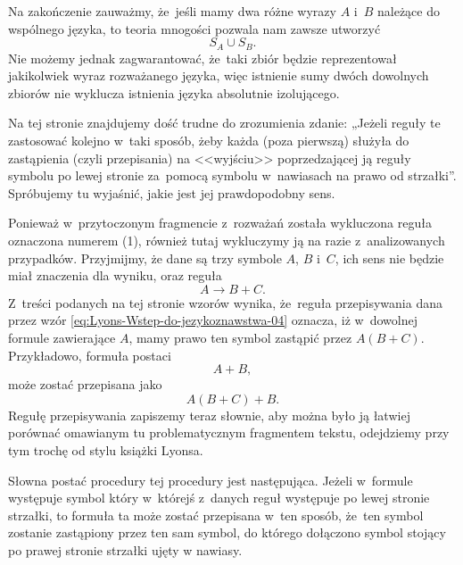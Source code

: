 \documentclass[a4paper,11pt]{article}
\begin{document}
Na zakończenie zauważmy, że~jeśli mamy dwa różne wyrazy $A$ i~$B$ należące
do wspólnego języka, to teoria mnogości pozwala nam zawsze utworzyć
\begin{equation}
  \label{eq:Lyons-Wstep-do-jezykoznawstwa-03}
  S_{ A } \cup S_{ B }.
\end{equation}
Nie możemy jednak zagwarantować, że~taki zbiór będzie reprezentował
jakikolwiek wyraz rozważanego języka, więc istnienie sumy dwóch dowolnych
zbiorów nie wyklucza istnienia języka absolutnie izolującego.

\vspace{\spaceFour}





 Na tej stronie znajdujemy dość trudne do zrozumienia
zdanie: „Jeżeli reguły te zastosować kolejno w~taki sposób, żeby każda (poza
pierwszą) służyła do zastąpienia (czyli przepisania) na <<wyjściu>>
poprzedzającej ją reguły symbolu po lewej stronie za~pomocą symbolu
w~nawiasach na prawo od strzałki”. Spróbujemy tu wyjaśnić, jakie jest jej
prawdopodobny sens.

Ponieważ w~przytoczonym fragmencie z~rozważań została wykluczona reguła
oznaczona numerem (1), również tutaj wykluczymy ją na razie z~analizowanych
przypadków. Przyjmijmy, że dane są trzy symbole $A$, $B$ i~$C$, ich sens nie
będzie miał znaczenia dla wyniku, oraz reguła
\begin{equation}
  \label{eq:Lyons-Wstep-do-jezykoznawstwa-04}
  A \to B + C.
\end{equation}
Z~treści podanych na tej stronie wzorów wynika, że~reguła przepisywania dana
przez wzór \eqref{eq:Lyons-Wstep-do-jezykoznawstwa-04} oznacza, iż
w~dowolnej formule zawierające $A$, mamy prawo ten symbol zastąpić przez
$A( B + C )$. Przykładowo, formuła postaci
\begin{equation}
  \label{eq:Lyons-Wstep-do-jezykoznawstwa-05}
  A + B,
\end{equation}
może zostać przepisana jako
\begin{equation}
  \label{eq:Lyons-Wstep-do-jezykoznawstwa-06}
  A( B + C ) + B.
\end{equation}
Regułę przepisywania zapiszemy teraz słownie, aby można było ją łatwiej
porównać omawianym tu problematycznym fragmentem tekstu, odejdziemy przy tym
trochę od stylu książki Lyonsa.

Słowna postać procedury tej procedury jest następująca. Jeżeli w~formule
występuje symbol który w~którejś z~danych reguł występuje po lewej stronie
strzałki, to formuła ta może zostać przepisana w~ten sposób, że~ten symbol
zostanie zastąpiony przez ten sam symbol, do którego dołączono symbol
stojący po prawej stronie strzałki ujęty w nawiasy.
\end{document}
